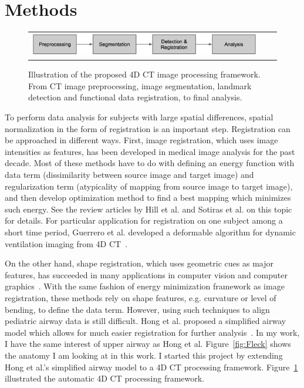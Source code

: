 \section{Methods}
\label{sec:methods}
\begin{figure}[tb]
  \begin{center}
    \begin{tabular}{ccc}
    \includegraphics[width=\figfullwidth] {fig/framework.png}
    \end{tabular}
    \caption{ \label{fig:framework} Illustration of the proposed 4D CT image processing framework. From CT image preprocessing, image segmentation, landmark detection and functional data registration, to final analysis.
    }
  \end{center}
\end{figure}

To perform data analysis for subjects with large spatial differences, spatial normalization in the form of registration is an important step.
Registration can be approached in different ways.
First, image registration, which uses image intensities as features, has been developed in medical image analysis for the past decade.
Most of these methods have to do with defining an energy function with data term (dissimilarity between source image and target image) and regularization term (atypicality of mapping from source image to target image),
and then develop optimization method to find a best mapping which minimizes such energy.
See the review articles by Hill et al. and Sotiras et al. on this topic~\cite{hill2001medical,otiras2013deformable} for details.
For particular application for registration on one subject among a short time period, Guerrero et al. developed a deformable algorithm for dynamic ventilation imaging from 4D CT~\cite{guerrero2006dynamic}.

On the other hand, shape registration, which uses geometric cues as major features, has succeeded in many applications in computer vision and computer graphics~\cite{belongie2002shape,li2012temporally}.
With the same fashion of energy minimization framework as image registration, these methods rely on shape features, e.g. curvature or level of bending, to define the data term.
However, using such techniques to align pediatric airway data is still difficult.
Hong et al. proposed a simplified airway model which allows for much easier registration for further analysis~\cite{hong2014statistical}.
In my work, I have the same interest of upper airway as Hong et al.
Figure~\ref{fig:Fleck} shows the anatomy I am looking at in this work.
I started this project by extending Hong et al.'s simplified airway model to a 4D CT processing framework.
Figure~\ref{fig:framework} illustrated the automatic 4D CT processing framework.


